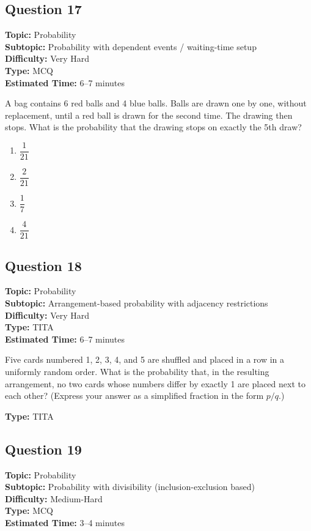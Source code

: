 \documentclass[11pt]{article}
\begin{document}
\subsection*{Question 17}
\textbf{Topic:} Probability \\
\textbf{Subtopic:} Probability with dependent events / waiting-time setup \\
\textbf{Difficulty:} Very Hard \\
\textbf{Type:} MCQ \\
\textbf{Estimated Time:} 6--7 minutes

\begin{tcolorbox}
A bag contains 6 red balls and 4 blue balls. Balls are drawn one by one, without replacement, until a red ball is drawn for the second time. The drawing then stops. What is the probability that the drawing stops on exactly the 5th draw?
\end{tcolorbox}

\begin{enumerate}[label=(\Alph*)]
\item \( \dfrac{1}{21} \)
\item \( \dfrac{2}{21} \)
\item \( \dfrac{1}{7} \)
\item \( \dfrac{4}{21} \)
\end{enumerate}

\subsection*{Question 18}
\textbf{Topic:} Probability \\
\textbf{Subtopic:} Arrangement-based probability with adjacency restrictions \\
\textbf{Difficulty:} Very Hard \\
\textbf{Type:} TITA \\
\textbf{Estimated Time:} 6--7 minutes

\begin{tcolorbox}
Five cards numbered 1, 2, 3, 4, and 5 are shuffled and placed in a row in a uniformly random order. What is the probability that, in the resulting arrangement, no two cards whose numbers differ by exactly 1 are placed next to each other? (Express your answer as a simplified fraction in the form \( p/q \).)
\end{tcolorbox}

\textbf{Type:} TITA

\subsection*{Question 19}
\textbf{Topic:} Probability \\
\textbf{Subtopic:} Probability with divisibility (inclusion-exclusion based) \\
\textbf{Difficulty:} Medium-Hard \\
\textbf{Type:} MCQ \\
\textbf{Estimated Time:} 3--4 minutes
\end{document}
